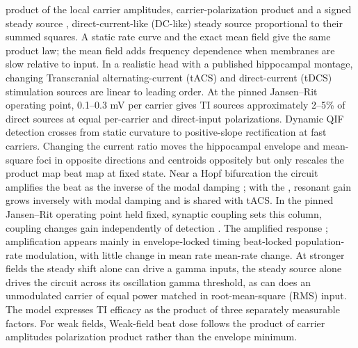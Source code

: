 \documentclass[11pt,a4paper]{article}
\providecommand{\DIFaddtex}[1]{{\protect\color{blue} \sf #1}} %
\providecommand{\DIFdeltex}[1]{{\protect\color{red} \scriptsize #1}} %
\providecommand{\DIFaddbegin}{} %
\providecommand{\DIFaddend}{} %
\providecommand{\DIFdelbegin}{} %
\providecommand{\DIFdelend}{} %
\providecommand{\DIFadd}[1]{\texorpdfstring{\DIFaddtex{#1}}{#1}} %
\providecommand{\DIFdel}[1]{\texorpdfstring{\DIFdeltex{#1}}{}} %
\begin{document}
\DIFdelbegin \DIFdel{product of the local carrier amplitudes, }\DIFdelend \DIFaddbegin \DIFadd{carrier-polarization product }\DIFaddend and a signed\DIFdelbegin \DIFdel{steady
source }\DIFdelend \DIFaddbegin \DIFadd{, direct-current-like (DC-like) steady source
proportional }\DIFaddend to their summed squares. \DIFdelbegin \DIFdel{A static rate curve and the exact
mean field give the same product law; the mean field adds frequency dependence
when membranes are slow relative to input. In a realistic head with a published hippocampal montage, changing }\DIFdelend \DIFaddbegin \DIFadd{Transcranial alternating-current (tACS) and direct-current (tDCS)
stimulation sources are linear to leading order. At the pinned
Jansen--Rit operating point, 0.1--0.3 mV per carrier gives TI sources approximately
2--5\% of direct sources at equal per-carrier and direct-input
polarizations. Dynamic QIF detection crosses from static curvature to positive-slope
rectification at fast carriers. Changing }\DIFaddend the current ratio moves the \DIFaddbegin \DIFadd{hippocampal
}\DIFaddend envelope and mean-square \DIFdelbegin \DIFdel{foci in opposite directions and }\DIFdelend \DIFaddbegin \DIFadd{centroids oppositely but }\DIFaddend only rescales the \DIFdelbegin \DIFdel{product map }\DIFdelend \DIFaddbegin \DIFadd{beat map at
fixed state}\DIFaddend . Near a Hopf bifurcation\DIFdelbegin \DIFdel{the
circuit amplifies the beat as the inverse of the modal damping
; with the
}\DIFdelend \DIFaddbegin \DIFadd{, resonant gain grows inversely with modal damping
and is shared with tACS. In the pinned }\DIFaddend Jansen--Rit \DIFdelbegin \DIFdel{operating point held fixed, synaptic coupling sets this }\DIFdelend \DIFaddbegin \DIFadd{column, coupling changes }\DIFaddend gain
independently of detection\DIFdelbegin \DIFdel{. The amplified response }\DIFdelend \DIFaddbegin \DIFadd{; amplification }\DIFaddend appears mainly in \DIFdelbegin \DIFdel{envelope-locked timing}\DIFdelend \DIFaddbegin \DIFadd{beat-locked population-rate
modulation}\DIFaddend , with little \DIFdelbegin \DIFdel{change in mean rate}\DIFdelend \DIFaddbegin \DIFadd{mean-rate change}\DIFaddend . At stronger \DIFdelbegin \DIFdel{fields the steady shift alone can drive a gamma }\DIFdelend \DIFaddbegin \DIFadd{inputs, the steady source alone drives the }\DIFaddend circuit across its \DIFdelbegin \DIFdel{oscillation }\DIFdelend \DIFaddbegin \DIFadd{gamma
}\DIFaddend threshold, as \DIFdelbegin \DIFdel{can }\DIFdelend \DIFaddbegin \DIFadd{does }\DIFaddend an unmodulated carrier \DIFdelbegin \DIFdel{of equal power}\DIFdelend \DIFaddbegin \DIFadd{matched in root-mean-square (RMS) input}\DIFaddend .\ \DIFdelbegin \DIFdel{The model expresses TI efficacy as the product of three
separately measurable factors. For weak fields, }\DIFdelend \DIFaddbegin \DIFadd{Weak-field beat }\DIFaddend dose follows the \DIFdelbegin \DIFdel{product of carrier
amplitudes }\DIFdelend \DIFaddbegin \DIFadd{polarization product }\DIFaddend rather than the envelope minimum.
\end{document}
